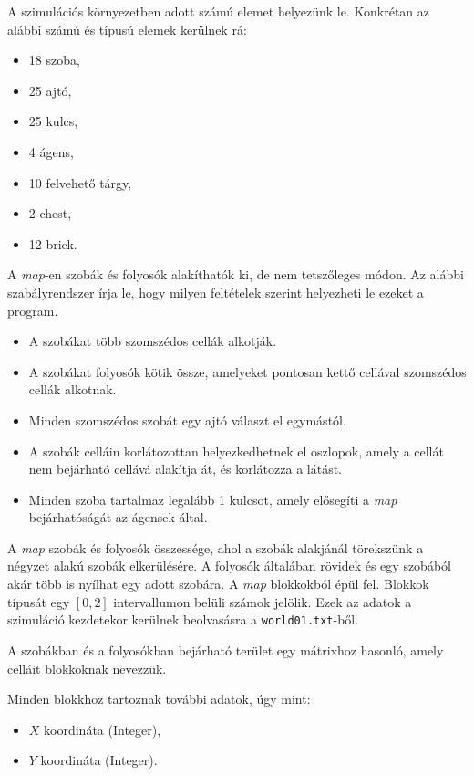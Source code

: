 A szimulációs környezetben adott számú elemet helyezünk le. Konkrétan az alábbi számú és típusú elemek kerülnek rá:
\begin{itemize}
    \item 18 szoba, 
    \item 25 ajtó,
    \item 25 kulcs,
    \item 4 ágens,
    \item 10 felvehető tárgy,
    \item 2 chest,
    \item 12 brick.
\end{itemize}


A \textit{map}-en szobák és folyosók alakíthatók ki, de nem tetszőleges módon. Az alábbi szabályrendszer írja le, hogy milyen feltételek szerint helyezheti le ezeket a program.
\begin{itemize}
\item A szobákat több szomszédos cellák alkotják.
\item A szobákat folyosók kötik össze, amelyeket pontosan kettő cellával szomszédos cellák alkotnak.
\item Minden szomszédos szobát egy ajtó választ el egymástól.
\item A szobák celláin korlátozottan helyezkedhetnek el oszlopok, amely a cellát nem bejárható cellává alakítja át, és korlátozza a látást.
\item Minden szoba tartalmaz legalább 1 kulcsot, amely elősegíti a \textit{map} bejárhatóságát az ágensek által.
\end{itemize}


A \textit{map} szobák és folyosók összessége, ahol a szobák alakjánál törekszünk a négyzet alakú szobák elkerülésére. A folyosók általában rövidek és egy szobából akár több is nyílhat egy adott szobára.
A \textit{map} blokkokból épül fel. Blokkok típusát egy $[0, 2]$ intervallumon belüli számok jelölik.
Ezek az adatok a szimuláció kezdetekor kerülnek beolvasásra a \texttt{world01.txt}-ből.

A szobákban és a folyosókban bejárható terület egy mátrixhoz hasonló, amely celláit blokkoknak nevezzük.

Minden blokkhoz tartoznak további adatok, úgy mint:
\begin{itemize}
    \item $X$ koordináta (Integer),
    \item $Y$ koordináta (Integer).
\end{itemize}

